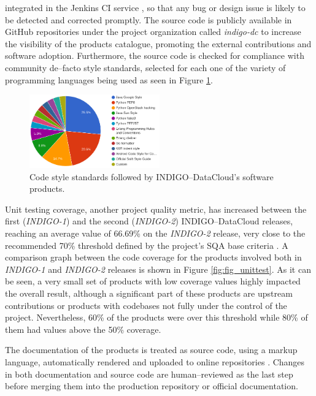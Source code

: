 \documentclass[journal]{IEEEtran}
\begin{document}
integrated in the Jenkins CI service \cite{indigo-jenkins}, so that any
bug or design issue is likely to be detected and corrected promptly. The source
code is publicly available in GitHub repositories under the project organization called
{\sl indigo-dc} \cite{indigo-github} to increase the visibility of the products
catalogue, promoting the external contributions and software adoption. Furthermore,
the source code is checked for compliance with community de--facto style standards,
selected for each one of the variety of programming languages being used as seen in
Figure \ref{fig:fig_codestyle}.

\begin{figure}[ht]
\centering
\includegraphics[width=0.5\textwidth]{images/codestyle.png}
\caption{Code style standards followed by INDIGO--DataCloud's software products.}
\label{fig:fig_codestyle}
\end{figure}

Unit testing coverage, another project quality metric, has increased between the first ({\sl INDIGO-1}) and the
second ({\sl INDIGO-2}) INDIGO--DataCloud releases, reaching an average value of
66.69\% on the {\sl INDIGO-2} release, very close to the recommended 70\% threshold
defined by the project’s SQA base criteria \cite{indigo-d31}. A comparison graph
between the code coverage for the products involved both in {\sl INDIGO-1} and
{\sl INDIGO-2} releases is shown in Figure \ref{fig:fig_unittest}. As it can be seen,
a very small set of products with low coverage values highly impacted the overall
result, although a significant part of these products are upstream contributions
or products with codebases not fully under the control of the project. Nevertheless,
60\% of the products were over this threshold while 80\% of them had values above
the 50\% coverage.

The documentation of the products is treated as source code, using a markup
language, automatically rendered and uploaded to online repositories
\cite{indigo-gitbook}. Changes in both documentation and source code are
human--reviewed as the last step before merging them into the production
repository or official documentation.
\end{document}
